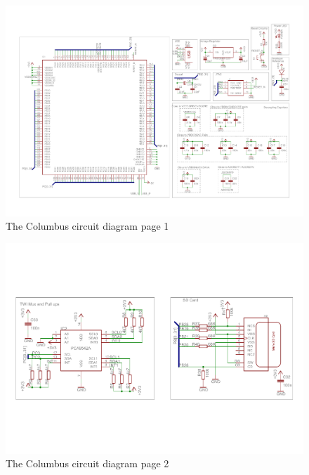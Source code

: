 \begin{figure}
\centering
\includegraphics[width=\textheight,height=\textwidth,keepaspectratio]{./Figures/ColumbusCircuitPage1.pdf}
\caption{The Columbus circuit diagram page 1}
\label{sch:Columbus_Schematic:1}
\end{figure}

\begin{figure}
\centering
\includegraphics[width=\textheight,keepaspectratio]{./Figures/ColumbusCircuitPage2.pdf}
\caption{The Columbus circuit diagram page 2}
\label{sch:Columbus_Schematic:2}
\end{figure}

